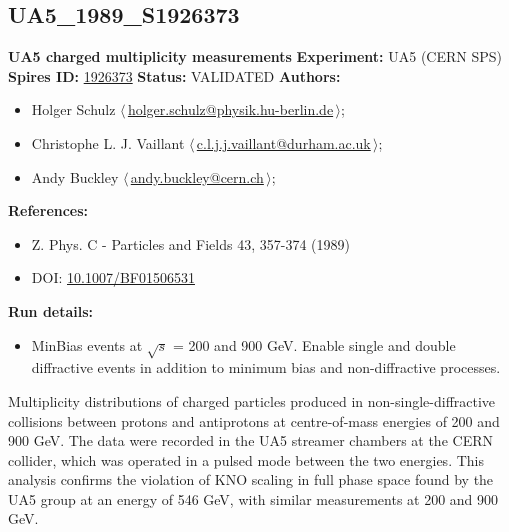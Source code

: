 \clearpage


\clearpage

\subsection[UA5\_1989\_S1926373]{UA5\_1989\_S1926373\,\cite{Ansorge:1988kn}}
\textbf{UA5 charged multiplicity measurements}\newline
\textbf{Experiment:} UA5 (CERN SPS) \newline
\textbf{Spires ID:} \href{http://www.slac.stanford.edu/spires/find/hep/www?rawcmd=key+1926373}{1926373}\newline
\textbf{Status:} VALIDATED\newline
\textbf{Authors:}
\begin{itemize}
  \item Holger Schulz $\langle\,$\href{mailto:holger.schulz@physik.hu-berlin.de}{holger.schulz@physik.hu-berlin.de}$\,\rangle$;
  \item Christophe L. J. Vaillant $\langle\,$\href{mailto:c.l.j.j.vaillant@durham.ac.uk}{c.l.j.j.vaillant@durham.ac.uk}$\,\rangle$;
  \item Andy Buckley $\langle\,$\href{mailto:andy.buckley@cern.ch}{andy.buckley@cern.ch}$\,\rangle$;
\end{itemize}
\textbf{References:}
\begin{itemize}
  \item Z. Phys. C - Particles and Fields 43, 357-374 (1989)
  \item DOI: \href{http://dx.doi.org/10.1007/BF01506531}{10.1007/BF01506531}
\end{itemize}
\textbf{Run details:}
\begin{itemize}

  \item MinBias events at \ensuremath{\sqrt{s}} = 200 and 900 GeV. Enable single and double diffractive events in addition to minimum bias and non-diffractive processes.\end{itemize}

\noindent Multiplicity distributions of charged particles produced in non-single-diffractive  collisions between protons and antiprotons at centre-of-mass energies of 200 and  900 GeV. The data were recorded in the UA5 streamer chambers at the CERN collider,  which was operated in a pulsed mode between the two energies. This analysis confirms the violation of KNO scaling in full phase space found by the UA5 group  at an energy of 546 GeV, with similar measurements at 200 and 900 GeV.

